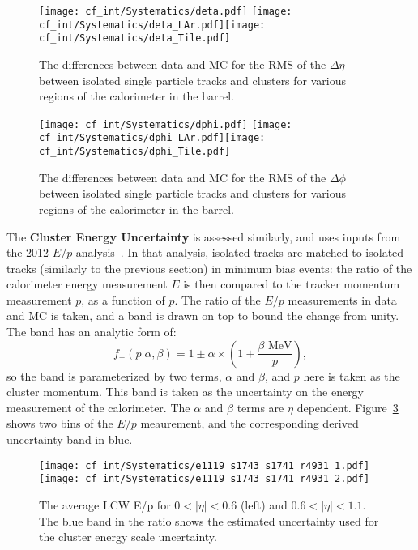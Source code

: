 \begin{figure}[h!]
\begin{center}
\texttt{[image: cf\_int/Systematics/deta.pdf]}
\texttt{[image: cf\_int/Systematics/deta\_LAr.pdf]}\texttt{[image: cf\_int/Systematics/deta\_Tile.pdf]}
\end{center}
\caption{The differences between data and MC for the RMS of the $\Delta \eta$ between isolated single particle tracks and clusters for various regions of the calorimeter in the barrel.}
\label{fig:color:uncertainties:clusters:deta}
\end{figure}

\begin{figure}[h!]
\begin{center}
\texttt{[image: cf\_int/Systematics/dphi.pdf]}
\texttt{[image: cf\_int/Systematics/dphi\_LAr.pdf]}\texttt{[image: cf\_int/Systematics/dphi\_Tile.pdf]}
\end{center}
\caption{The differences between data and MC for the RMS of the $\Delta \phi$ between isolated single particle tracks and clusters for various regions of the calorimeter in the barrel.}
\label{fig:color:uncertainties:clusters:dphi}
\end{figure}

	The \textbf{Cluster Energy Uncertainty} is assessed similarly, and uses inputs from the 2012 $E/p$ analysis~. In that analysis, isolated tracks are matched to isolated tracks (similarly to the previous section) in minimum bias events: the ratio of the calorimeter energy measurement $E$ is then compared to the tracker momentum measurement $p$, as a function of $p$. The ratio of the $E/p$ measurements in data and MC is taken, and a band is drawn on top to bound the change from unity. The band has an analytic form of:
	\begin{equation}
	f_\pm(p|\alpha,\beta)= 1\pm \alpha \times\left(1+\frac{\beta\text{ MeV}}{p}\right),
	\end{equation}
	so the band is parameterized by two terms, $\alpha$ and $\beta$, and $p$ here is taken as the cluster momentum. This band is taken as the uncertainty on the energy measurement of the calorimeter. The $\alpha$ and $\beta$ terms are $\eta$ dependent. Figure~\ref{fig:color:uncertainties:clusters:ep} shows two bins of the $E/p$ meaurement, and the corresponding derived uncertainty band in blue.


\begin{figure}[h!]
\begin{center}
\texttt{[image: cf\_int/Systematics/e1119\_s1743\_s1741\_r4931\_1.pdf]}\texttt{[image: cf\_int/Systematics/e1119\_s1743\_s1741\_r4931\_2.pdf]}
\end{center}
\caption{The average LCW E/p for $0<|\eta|<0.6$ (left) and $0.6<|\eta|<1.1$. The blue band in the ratio shows the estimated uncertainty used for the cluster energy scale uncertainty.}
\label{fig:color:uncertainties:clusters:ep}
\end{figure}

